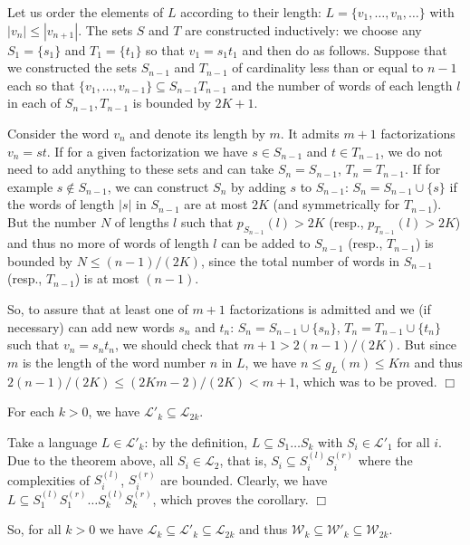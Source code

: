 \documentclass[runningheads,envcountsect,envcountsame]{llncs}
\begin{document}
Let us order the elements of $L$ according to their length:
$L=\{v_1,\ldots, v_n,\ldots\}$ with $|v_n|\leq |v_{n+1}|$. The
sets $S$ and $T$ are constructed inductively: we choose any
$S_1=\{s_1\}$ and $T_1=\{t_1\}$ so that $v_1=s_1t_1$ and then do
as follows. Suppose that we constructed the sets $S_{n-1}$ and
$T_{n-1}$ of cardinality less than or equal to $n-1$ each so that
$\{v_1,\ldots,v_{n-1}\}\subseteq S_{n-1}T_{n-1}$ and the number of
words of each length $l$ in each of  $S_{n-1},T_{n-1}$ is bounded
by $2K+1$.

 Consider the word $v_n$ and denote its length by $m$. It admits $m+1$
 factorizations $v_n=st$. If for a given factorization we have $s \in S_{n-1}$ and $t \in T_{n-1}$,
 we do not need to add anything to these sets and can take $S_n=S_{n-1}$, $T_n=T_{n-1}$. If for example $s \notin S_{n-1}$, we can construct $S_{n}$
 by adding $s$ to $S_{n-1}$: $S_n=S_{n-1}\cup \{s\}$ if the words of length $|s|$ in $S_{n-1}$ are at most $2K$ (and symmetrically for $T_{n-1}$).
 But the number $N$ of lengths $l$ such that $p_{S_{n-1}}(l)>2K$ (resp., $p_{T_{n-1}}(l)>2K$)
 and thus no more of words of length $l$ can be added to $S_{n-1}$ (resp., $T_{n-1}$) is bounded by $N\leq (n-1)/(2K)$,
 since the total number of words in $S_{n-1}$ (resp., $T_{n-1}$) is at most $(n-1)$.

So, to assure that at least one of $m+1$ factorizations is
admitted and we (if necessary) can add new words $s_n$ and $t_n$:
$S_n=S_{n-1}\cup \{s_n\}$, $T_n=T_{n-1}\cup \{t_n\}$ such that
$v_n=s_nt_n$, we should check that $m+1
> 2(n-1)/(2K)$. But since $m$ is the length of the word number $n$
in $L$, we have $n \leq g_L(m)\leq Km$ and thus $2(n-1)/(2K)\leq
(2Km-2)/(2K) <m+1$, which was to be proved. \hfill $\Box$

\begin{corollary}
For each $k>0$, we have $\mathcal L'_k \subseteq \mathcal L_{2k}$.
\end{corollary}
 Take a language $L \in \mathcal L'_k$: by the definition, $L\subseteq S_1\ldots S_k$ with $S_i \in \mathcal L'_1$ for all $i$. Due to the theorem above, all $S_i \in \mathcal L_2$, that is, $S_i \subseteq S_{i}^{(l)}S_i^{(r)}$ where the complexities of $S_{i}^{(l)}$, $S_i^{(r)}$ are bounded. Clearly, we have
$L\subseteq S_{1}^{(l)}S_1^{(r)}\ldots S_{k}^{(l)}S_k^{(r)}$, which proves the corollary. \hfill $\Box$

\medskip
So, for all $k>0$ we have $\mathcal L_k \subseteq \mathcal L'_k \subseteq \mathcal L_{2k}$ and thus $\mathcal W_k \subseteq \mathcal W'_k \subseteq \mathcal W_{2k}$.
\end{document}
